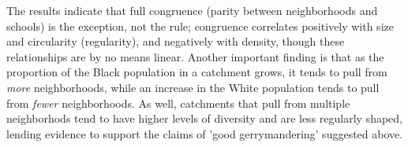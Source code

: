 The results indicate that full congruence (parity between
neighborhoods and schools) is the exception, not the rule; congruence
correlates positively with size and circularity (regularity), and
negatively with density, though these relationships are by no means
linear. Another important finding is that as the proportion of the
Black population in a catchment grows, it tends to pull from
\emph{more} neighborhoods, while an increase in the White population
tends to pull from \emph{fewer} neighborhoods. As well, catchments
that pull from multiple neighborhods tend to have higher levels of
diversity and are less regularly shaped, lending evidence to support
the claims of 'good gerrymandering' suggested above.
